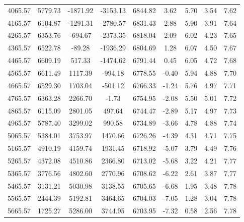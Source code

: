 \begin{center}
\begin{longtable}{|c|c|c|c|c|c|c|c|c|}
    4065.57 & 5779.73 & -1871.92 & -3153.13  & 6844.82 & 3.62 &  5.70 &  3.54 & 7.62 \\ 
    4165.57 & 6104.87 & -1291.31 & -2780.57  & 6831.43 & 2.88 &  5.90 &  3.91 & 7.64 \\ 
    4265.57 & 6353.76 & -694.67 & -2373.35  & 6818.04 & 2.09 &  6.02 &  4.23 & 7.65 \\ 
    4365.57 & 6522.78 & -89.28 & -1936.29  & 6804.69 & 1.28 &  6.07 &  4.50 & 7.67 \\ 
    4465.57 & 6609.19 & 517.33 & -1474.62  & 6791.44 & 0.45 &  6.05 &  4.72 & 7.68 \\ 
    4565.57 & 6611.49 & 1117.39 & -994.18  & 6778.55 & -0.40 &  5.94 &  4.88 & 7.70 \\ 
    4665.57 & 6529.30 & 1703.04 & -501.12  & 6766.33 & -1.24 &  5.76 &  4.97 & 7.71 \\ 
    4765.57 & 6363.28 & 2266.70 & -1.73  & 6754.95 & -2.08 &  5.50 &  5.01 & 7.72 \\ 
    4865.57 & 6115.09 & 2801.05 & 497.64  & 6744.47 & -2.89 &  5.17 &  4.97 & 7.73 \\ 
    4965.57 & 5787.40 & 3299.02 & 990.58  & 6734.89 & -3.66 &  4.78 &  4.88 & 7.74 \\ 
    5065.57 & 5384.01 & 3753.97 & 1470.66  & 6726.26 & -4.39 &  4.31 &  4.71 & 7.75 \\ 
    5165.57 & 4910.19 & 4159.74 & 1931.45  & 6718.92 & -5.07 &  3.79 &  4.49 & 7.76 \\ 
    5265.57 & 4372.08 & 4510.86 & 2366.80  & 6713.02 & -5.68 &  3.22 &  4.21 & 7.77 \\ 
    5365.57 & 3776.56 & 4802.60 & 2770.96  & 6708.62 & -6.22 &  2.61 &  3.87 & 7.77 \\ 
    5465.57 & 3131.21 & 5030.98 & 3138.55  & 6705.65 & -6.68 &  1.95 &  3.48 & 7.78 \\ 
    5565.57 & 2444.39 & 5192.81 & 3464.65  & 6704.03 & -7.05 &  1.28 &  3.04 & 7.78 \\ 
    5665.57 & 1725.27 & 5286.00 & 3744.95  & 6703.95 & -7.32 &  0.58 &  2.56 & 7.78 \\ 
   
    \end{longtable}
    \end{center}